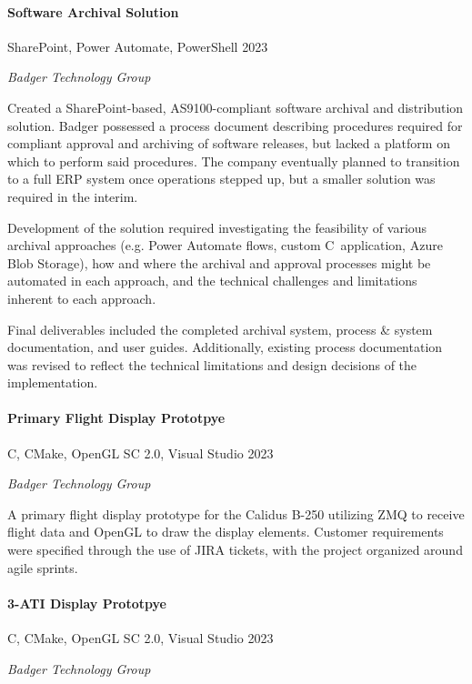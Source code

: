 \documentclass[10pt]{article}
\newcommand{\Rplus}{\protect\raisebox{0.35ex}{\smaller{\smaller{\textbf{+}}}}}
\newcommand{\Rsharp}{\protect\raisebox{0.35ex}{\smaller{\smaller{\textbf{\#}}}}}
\newcommand{\Cpp}{\mbox{C\Rplus\Rplus}}
\newcommand{\Csharp}{\mbox{C\Rsharp}}
\newcommand{\firstpar}{\vspace{4pt}\noindent}
\begin{document}
\paragraph{Software Archival Solution}
\vline\quad SharePoint, Power Automate, PowerShell \hfill 2023

\noindent
\textit{Badger Technology Group}

\firstpar
Created a SharePoint-based, AS9100-compliant software archival and distribution solution.
Badger possessed a process document describing procedures required for compliant approval
and archiving of software releases, but lacked a platform on which to perform said procedures.
The company eventually planned to transition to a full ERP system once operations
stepped up, but a smaller solution was required in the interim.

Development of the solution required investigating the feasibility of various archival
approaches (e.g. Power Automate flows, custom \Csharp\ application, Azure Blob Storage),
how and where the archival and approval processes might be automated in each approach,
and the technical challenges and limitations inherent to each approach.

Final deliverables included the completed archival system, process \& system documentation,
and user guides. Additionally, existing process documentation was revised to reflect the
technical limitations and design decisions of the implementation.

\paragraph{Primary Flight Display Prototpye}
\vline\quad \Cpp, CMake, OpenGL SC 2.0, Visual Studio \hfill 2023

\noindent
\textit{Badger Technology Group}

\firstpar
A primary flight display prototype for the Calidus B-250 utilizing ZMQ to receive flight data
and OpenGL to draw the display elements. Customer requirements were specified through the use
of JIRA tickets, with the project organized around agile sprints.

\paragraph{3-ATI Display Prototpye}
\vline\quad \Cpp, CMake, OpenGL SC 2.0, Visual Studio \hfill 2023

\noindent
\textit{Badger Technology Group}
\end{document}
